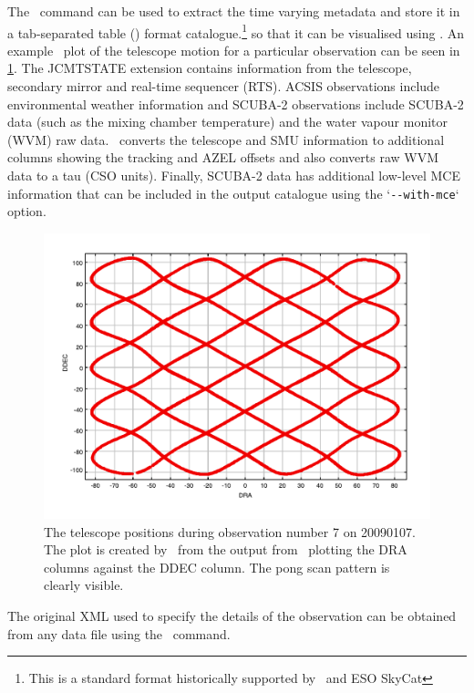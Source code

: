 \documentclass[oneside,11pt]{starlink}
\begin{document}
The \jcmtstate\ command can be used to extract the time varying
metadata and store it in a tab-separated table
() format catalogue.\footnote{This is a
  standard format historically supported by \CURSA\ and ESO SkyCat} so
that it can be visualised using \topcat. An example \topcat\ plot of the
telescope motion for a particular observation can be seen in
\ref{fig:topcat}. The JCMTSTATE extension contains information from
the telescope, secondary mirror and real-time sequencer (RTS). ACSIS
observations include environmental weather information and SCUBA-2
observations include SCUBA-2 data (such as the mixing chamber
temperature) and the water vapour monitor (WVM) raw data. \jcmtstate\
converts the telescope and SMU information to additional columns
showing the tracking and AZEL offsets and also converts raw WVM data
to a tau (CSO units). Finally, SCUBA-2 data has additional low-level
MCE information that can be included in the output catalogue using the
`\verb+--with-mce+` option.

\begin{figure}
\begin{center}
\includegraphics[width=1\textwidth]{sun258_scan_pattern}
\caption{The telescope positions during observation number 7 on
  20090107. The plot is created by \topcat\ from the output from
\jcmtstate\ plotting the DRA columns against the DDEC column. The pong
scan pattern is clearly visible.}
\label{fig:topcat}
\end{center}
\end{figure}

The original XML used to specify the details of the observation can be
obtained from any data file using the \dumpocscfg\ command.
\end{document}
